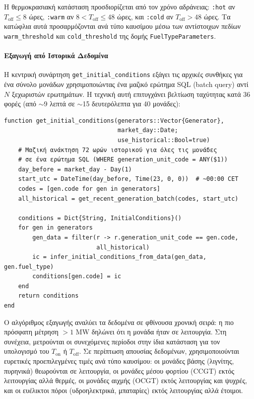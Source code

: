 Η θερμοκρασιακή κατάσταση προσδιορίζεται από τον χρόνο αδράνειας: \texttt{:hot} αν $T_{\text{off}} \leq 8$ ώρες, \texttt{:warm} αν $8 < T_{\text{off}} \leq 48$ ώρες, και \texttt{:cold} αν $T_{\text{off}} > 48$ ώρες. Τα κατώφλια αυτά προσαρμόζονται ανά τύπο καυσίμου μέσω των αντίστοιχων πεδίων \texttt{warm\_threshold} και \texttt{cold\_threshold} της δομής \texttt{FuelTypeParameters}.

\paragraph{Εξαγωγή από Ιστορικά Δεδομένα}
Η κεντρική συνάρτηση \texttt{get\_initial\_conditions} εξάγει τις αρχικές συνθήκες για ένα σύνολο μονάδων χρησιμοποιώντας ένα μαζικό ερώτημα SQL (batch query) αντί $N$ ξεχωριστών ερωτημάτων. Η τεχνική αυτή επιτυγχάνει βελτίωση ταχύτητας κατά 36 φορές (από $\sim$9 λεπτά σε $\sim$15 δευτερόλεπτα για 40 μονάδες):

\begin{samepage}
\begin{verbatim}
function get_initial_conditions(generators::Vector{Generator},
                                market_day::Date;
                                use_historical::Bool=true)
    # Μαζική ανάκτηση 72 ωρών ιστορικού για όλες τις μονάδες
    # σε ένα ερώτημα SQL (WHERE generation_unit_code = ANY($1))
    day_before = market_day - Day(1)
    start_utc = DateTime(day_before, Time(23, 0, 0))  # ~00:00 CET
    codes = [gen.code for gen in generators]
    all_historical = get_recent_generation_batch(codes, start_utc)

    conditions = Dict{String, InitialConditions}()
    for gen in generators
        gen_data = filter(r -> r.generation_unit_code == gen.code,
                          all_historical)
        ic = infer_initial_conditions_from_data(gen_data, gen.fuel_type)
        conditions[gen.code] = ic
    end
    return conditions
end
\end{verbatim}
\end{samepage}

Ο αλγόριθμος εξαγωγής αναλύει τα δεδομένα σε φθίνουσα χρονική σειρά: η πιο πρόσφατη μέτρηση $> 1$ MW δηλώνει ότι η μονάδα ήταν σε λειτουργία. Στη συνέχεια, μετρούνται οι συνεχόμενες περίοδοι στην ίδια κατάσταση για τον υπολογισμό του $T_{\text{on}}$ ή $T_{\text{off}}$. Σε περίπτωση απουσίας δεδομένων, χρησιμοποιούνται ευρετικές προεπιλεγμένες τιμές ανά τύπο καυσίμου: οι μονάδες βάσης (λιγνίτης, πυρηνικά) θεωρούνται σε λειτουργία, οι μονάδες μέσου φορτίου (CCGT) εκτός λειτουργίας αλλά θερμές, οι μονάδες αιχμής (OCGT) εκτός λειτουργίας και ψυχρές, και οι ευέλικτοι πόροι (υδροηλεκτρικά, μπαταρίες) εκτός λειτουργίας αλλά έτοιμοι.


